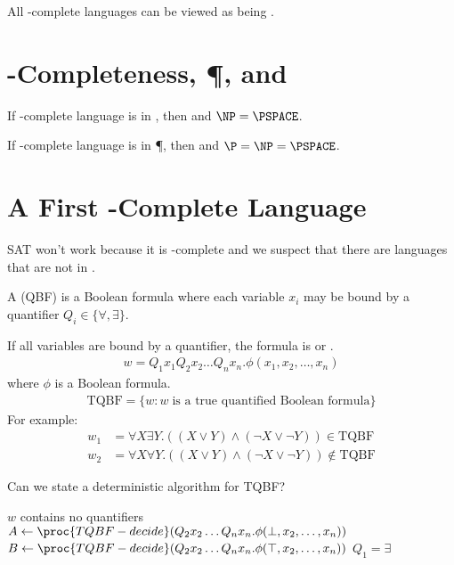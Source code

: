 \documentclass[a4paper]{report}
\newcommand{\bookref}[3]{\marginpar{\faBook{}~#1\\Chapter #2\\Section #3}}
\theoremstyle{definition}
\begin{document}
All \PSPACE-complete languages can be viewed as being .

\section{\PSPACE-Completeness, \P, and \NP}
\bookref{ER}{29}{29.3}
If  \PSPACE-complete language is  in \NP, then  and $\NP = \PSPACE$.

If  \PSPACE-complete language is  in \P, then  and $\P = \NP = \PSPACE$.

\begin{center}
\scalebox{0.3}{}
\end{center}

\section{A First \PSPACE-Complete Language}
\bookref{ER}{29}{29.3.1}
SAT won't work because it is \NP-complete and we suspect that there are \PSPACE{} languages that are not in \NP.

A  (QBF) is a Boolean formula where each variable $x_i$ may be bound by a quantifier $Q_i \in \{ \forall, \exists\}$.

If all variables are bound by a quantifier, the formula is  or .
\begin{align*}
w = Q_1x_1Q_2x_2 \dots{} Q_nx_n . \phi(x_1, x_2, \dots{}, x_n)
\end{align*}
%
where $\phi$ is a Boolean formula.
%
\begin{align*}
\text{TQBF} = \{ w : w \;\text{is a true quantified Boolean formula} \}
\end{align*}
%
For example:
\begin{align*}
w_1 &= \forall X \exists Y . ((X \vee Y) \wedge (\neg X \vee \neg Y)) \in \text{TQBF}\\
w_2 &= \forall X \forall Y . ((X \vee Y) \wedge (\neg X \vee \neg Y)) \not\in \text{TQBF}
\end{align*}

Can we state a deterministic algorithm for TQBF?

\begin{codebox}
\li \If $w$ contains no quantifiers
\li \Then {}
\End
\li $A \gets \proc{TQBF-decide}(Q_2x_2 \dots{} Q_nx_n . \phi(\bot, x_2, \dots{}, x_n))$
\li $B \gets \proc{TQBF-decide}(Q_2x_2 \dots{} Q_nx_n . \phi(\top, x_2, \dots{}, x_n))$
\li \If $Q_1 = \exists$
\li \Then {}
\End
\li {}
\end{codebox}
\end{document}
